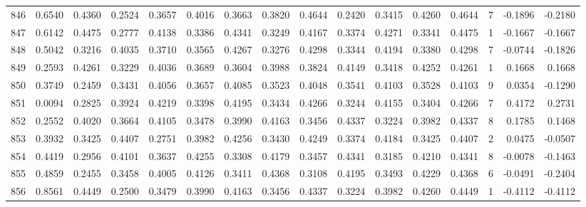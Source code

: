 \begin{tabular}{lrrrrrrrrrrrrrrr}
846 &      0.6540 &  0.4360 &  0.2524 &  0.3657 &  0.4016 &  0.3663 &  0.3820 &  0.4644 &  0.2420 &  0.3415 &   0.4260 &     0.4644 &      7 &                   -0.1896 &                    -0.2180 \\
847 &      0.6142 &  0.4475 &  0.2777 &  0.4138 &  0.3386 &  0.4341 &  0.3249 &  0.4167 &  0.3374 &  0.4271 &   0.3341 &     0.4475 &      1 &                   -0.1667 &                    -0.1667 \\
848 &      0.5042 &  0.3216 &  0.4035 &  0.3710 &  0.3565 &  0.4267 &  0.3276 &  0.4298 &  0.3344 &  0.4194 &   0.3380 &     0.4298 &      7 &                   -0.0744 &                    -0.1826 \\
849 &      0.2593 &  0.4261 &  0.3229 &  0.4036 &  0.3689 &  0.3604 &  0.3988 &  0.3824 &  0.4149 &  0.3418 &   0.4252 &     0.4261 &      1 &                    0.1668 &                     0.1668 \\
850 &      0.3749 &  0.2459 &  0.3431 &  0.4056 &  0.3657 &  0.4085 &  0.3523 &  0.4048 &  0.3541 &  0.4103 &   0.3528 &     0.4103 &      9 &                    0.0354 &                    -0.1290 \\
851 &      0.0094 &  0.2825 &  0.3924 &  0.4219 &  0.3398 &  0.4195 &  0.3434 &  0.4266 &  0.3244 &  0.4155 &   0.3404 &     0.4266 &      7 &                    0.4172 &                     0.2731 \\
852 &      0.2552 &  0.4020 &  0.3664 &  0.4105 &  0.3478 &  0.3990 &  0.4163 &  0.3456 &  0.4337 &  0.3224 &   0.3982 &     0.4337 &      8 &                    0.1785 &                     0.1468 \\
853 &      0.3932 &  0.3425 &  0.4407 &  0.2751 &  0.3982 &  0.4256 &  0.3430 &  0.4249 &  0.3374 &  0.4184 &   0.3425 &     0.4407 &      2 &                    0.0475 &                    -0.0507 \\
854 &      0.4419 &  0.2956 &  0.4101 &  0.3637 &  0.4255 &  0.3308 &  0.4179 &  0.3457 &  0.4341 &  0.3185 &   0.4210 &     0.4341 &      8 &                   -0.0078 &                    -0.1463 \\
855 &      0.4859 &  0.2455 &  0.3458 &  0.4005 &  0.4126 &  0.3411 &  0.4368 &  0.3108 &  0.4195 &  0.3493 &   0.4229 &     0.4368 &      6 &                   -0.0491 &                    -0.2404 \\
856 &      0.8561 &  0.4449 &  0.2500 &  0.3479 &  0.3990 &  0.4163 &  0.3456 &  0.4337 &  0.3224 &  0.3982 &   0.4260 &     0.4449 &      1 &                   -0.4112 &                    -0.4112 \\

\end{tabular}
